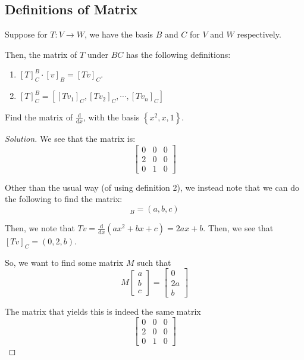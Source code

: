 \documentclass[openany]{book}
\newenvironment{solution}{\begin{proof}[Solution]}{\end{proof}}
\begin{document}
\subsection{Definitions of Matrix}
Suppose for $T : V \rightarrow W$, we have the basis $B$ and $C$ for $V$ and $W$ respectively.

Then, the matrix of $T$ under $BC$ has the following definitions:
\begin{enumerate}
	\item $[T]_{C}^{B} \cdot [v]_{B} = [Tv]_{C}$.
	\item $[T]_{C}^{B} = \left[ [Tv_{1}]_{C}, [Tv_{2}]_{C}, \cdots, [Tv_{n}]_{C} \right]$
\end{enumerate}

\begin{hw}
	Find the matrix of $\frac{\mathrm d}{\mathrm dx}$, with the basis $\left\{  x^{2}, x, 1\right\}$.
\end{hw}
\begin{solution}
	We see that the matrix is:
	\begin{equation*}
		\begin{bmatrix}
			0 & 0 & 0 \\
			2 & 0 & 0 \\
			0 & 1 & 0
		\end{bmatrix}
	\end{equation*}

	Other than the usual way (of using definition 2), we instead note that we can do the following to find the matrix:
	\begin{equation*}
		[v]_{B} = (a,b,c)
	\end{equation*}

	Then, we note that $Tv = \frac{\mathrm d}{\mathrm dx} (ax^{2} + bx + c) = 2ax + b$. Then, we see that $[Tv]_{C} = (0,2,b)$.
	
	So, we want to find some matrix $M$ such that
	\begin{equation*}
		M
		\begin{bmatrix}
			a \\ b \\ c
		\end{bmatrix}
		= \begin{bmatrix}
			0 \\ 2a \\ b
		\end{bmatrix}
	\end{equation*}

	The matrix that yields this is indeed the same matrix
	\begin{equation*}
		\begin{bmatrix}
			0 & 0 & 0 \\ 2 & 0 & 0 \\ 0 & 1 & 0
		\end{bmatrix}
	\end{equation*}
\end{solution}
\end{document}
